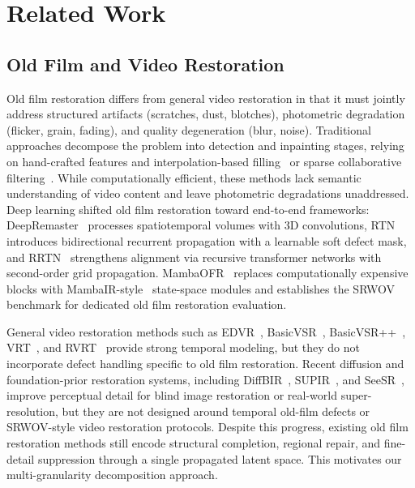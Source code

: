 \section{Related Work}
\label{sec:related}

\subsection{Old Film and Video Restoration}
\label{subsec:ofr}

Old film restoration differs from general video restoration in that it must jointly address structured artifacts (scratches, dust, blotches), photometric degradation (flicker, grain, fading), and quality degeneration (blur, noise). Traditional approaches decompose the problem into detection and inpainting stages, relying on hand-crafted features and interpolation-based filling~\cite{kokaram2004missing} or sparse collaborative filtering~\cite{dabov2007bm3d,he2013guided}. While computationally efficient, these methods lack semantic understanding of video content and leave photometric degradations unaddressed. Deep learning shifted old film restoration toward end-to-end frameworks: DeepRemaster~\cite{iizuka2019deepremaster} processes spatiotemporal volumes with 3D convolutions, RTN~\cite{wan2022rtn} introduces bidirectional recurrent propagation with a learnable soft defect mask, and RRTN~\cite{lin2024rrtn} strengthens alignment via recursive transformer networks with second-order grid propagation. MambaOFR~\cite{mao2025mambaofr} replaces computationally expensive blocks with MambaIR-style~\cite{guo2024mambair} state-space modules and establishes the SRWOV benchmark for dedicated old film restoration evaluation.

General video restoration methods such as EDVR~\cite{wang2019edvr}, BasicVSR~\cite{chan2021basicvsr}, BasicVSR++~\cite{chan2022basicvsrpp}, VRT~\cite{liang2024vrt}, and RVRT~\cite{liang2022rvrt} provide strong temporal modeling, but they do not incorporate defect handling specific to old film restoration. Recent diffusion and foundation-prior restoration systems, including DiffBIR~\cite{lin2024diffbir}, SUPIR~\cite{yu2024supir}, and SeeSR~\cite{wu2024seesr}, improve perceptual detail for blind image restoration or real-world super-resolution, but they are not designed around temporal old-film defects or SRWOV-style video restoration protocols. Despite this progress, existing old film restoration methods still encode structural completion, regional repair, and fine-detail suppression through a single propagated latent space. This motivates our multi-granularity decomposition approach.

